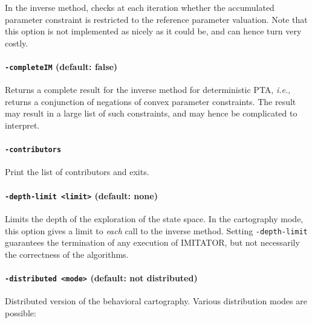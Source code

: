 \documentclass[a4paper,11pt]{report}
\makeatletter
\newcommand{\imitator}{\textsf{IMITATOR}}
\newcommand{\styleOption}[1]{\textcolor{optioncolor}{\texttt{#1}}}
\newcommand{\ie}{\textcolor{colorok}{\textit{i.e.},\@}}
\makeatother
\begin{document}
In the inverse method, checks at each iteration whether the accumulated parameter constraint is restricted to the reference parameter valuation.
Note that this option is not implemented as nicely as it could be, and can hence turn very costly.


\paragraph{\styleOption{-completeIM} (default: false)}

Returns a complete result for the inverse method for deterministic PTA, \ie{} returns a conjunction of negations of convex parameter constraints.
The result may result in a large list of such constraints, and may hence be complicated to interpret.


\paragraph{\styleOption{-contributors}}
Print the list of contributors and exits.


\paragraph{\styleOption{-depth-limit <limit>} (default: none)}
Limits the depth of the exploration of the state space.
In the cartography mode, this option gives a limit to \emph{each} call to the inverse method.
Setting \styleOption{-depth-limit} guarantees the termination of any execution of \imitator{}, but not necessarily the correctness of the algorithms.


\paragraph{\styleOption{-distributed <mode>} (default: not distributed)}
Distributed version of the behavioral cartography.
Various distribution modes are possible:
\end{document}
